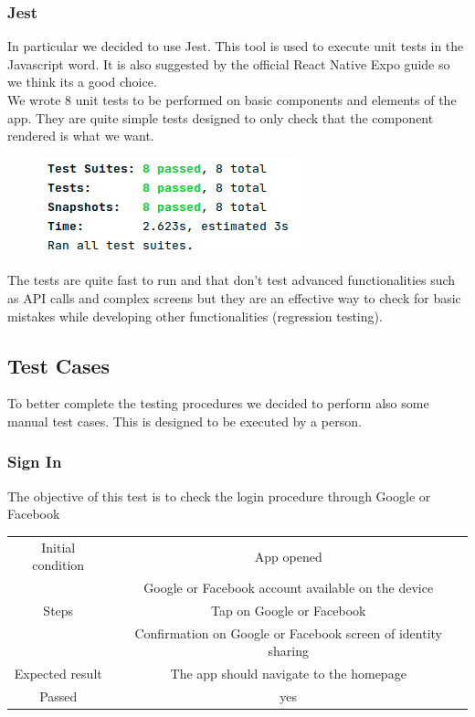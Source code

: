 \documentclass[10pt]{article}
\begin{document}
    \subsubsection{Jest}
    In particular we decided to use Jest. This tool is used to execute unit tests in the Javascript word. It is also suggested by the official React Native Expo guide so we think its a good choice.\\
    We wrote 8 unit tests to be performed on basic components and elements of the app. They are quite simple tests designed to only check that the component rendered is what we want.
    \begin{figure}[H]
    	\includegraphics[scale=0.6]{resources/unittest.png}
    \end{figure}
    The tests are quite fast to run and that don't test advanced functionalities such as API calls and complex screens but they are an effective way to check for basic mistakes while developing other functionalities (regression testing).
    \subsection{Test Cases}
    To better complete the testing procedures we decided to perform also some manual test cases. This is designed to be executed by a person.
    \subsubsection{Sign In}
    The objective of this test is to check the login procedure through Google or Facebook
    \begin{center}
    	\begin{tabular}{ |c|c| } 
    		\hline
    		Initial condition & App opened\\
    		 & Google or Facebook account available on the device\\
    		\hline
    		Steps & Tap on Google or Facebook\\
    		 & Confirmation on Google or Facebook screen of identity sharing\\
    		\hline
    		Expected result & The app should navigate to the homepage\\
    		\hline
    		Passed & yes\\
    		\hline
    	\end{tabular}
    \end{center}
\end{document}
